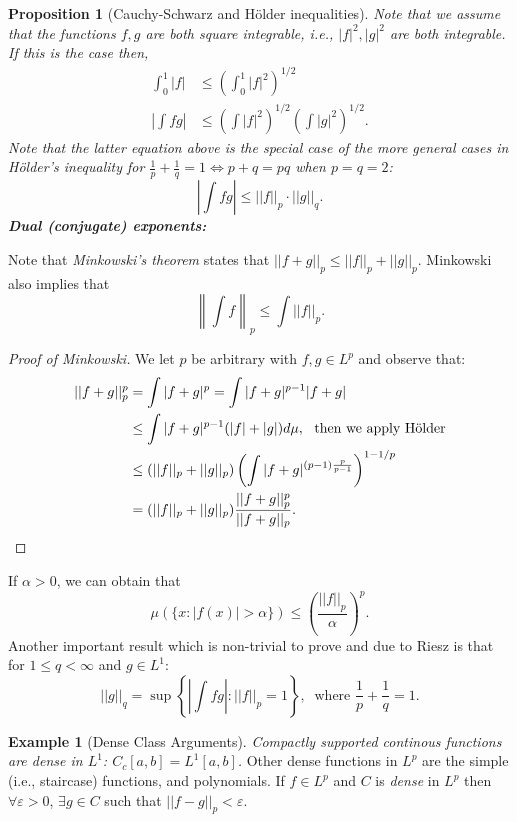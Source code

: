 \documentclass[12pt,reqno]{article}
\renewcommand{\emph}[1]{\textit{#1}}
\theoremstyle{plain}
\newtheorem{prop}[theorem]{Proposition}
\theoremstyle{definition}
\newtheorem{example}[theorem]{Example}
\begin{document}
\begin{prop}[Cauchy-Schwarz and H\"older inequalities] 
Note that we assume that the functions $f,g$ are both square integrable, i.e., 
$|f|^2,|g|^2$ are both integrable. If this is the case then, 
\begin{align*} 
\int_0^1 |f| & \leq \left(\int_0^1 |f|^2\right)^{1/2} \\ 
\left\lvert \int fg\right\rvert & \leq \left(\int |f|^2\right)^{1/2} \left(\int |g|^2\right)^{1/2}. 
\end{align*} 
Note that the latter equation above is the special case of the more general cases in 
\emph{H\"older's inequality} for $\frac{1}{p}+\frac{1}{q}=1 \iff p+q=pq$ when $p=q=2$: 
\[
\left\lvert \int fg \right\rvert \leq ||f||_p \cdot ||g||_q. 
\]
\textbf{Dual (conjugate) exponents:}  
\end{prop} 
\noindent 
Note that \emph{Minkowski's theorem} states that 
$||f+g||_p \leq ||f||_p + ||g||_p$. 
Minkowski also implies that 
\[
\left\lVert \int f \right\rVert_p \leq \int ||f||_p. 
\] 
\begin{proof}[Proof of Minkowski]
We let $p$ be arbitrary with $f,g \in L^p$ and observe that: 
\begin{align*} 
||f+g||_p^p & = \int |f+g|^p = \int |f+g|^{p-1} |f+g| \\ 
     & \leq \int |f+g|^{p-1}(|f|+|g|) d\mu,\ \text{ then we apply H\"older} \\ 
     & \leq (||f||_p+||g||_p) \left(\int |f+g|^{(p-1)\frac{p}{p-1}}\right)^{1-1/p} \\ 
     & = (||f||_p+||g||_p) \frac{||f+g||_p^p}{||f+g||_p}. 
     \qedhere
\end{align*} 
\end{proof} 
\noindent 
If $\alpha > 0$, we can obtain that 
\[
\mu\left(\{x : |f(x)| > \alpha\}\right) \leq \left(\frac{||f||_p}{\alpha}\right)^p. 
\]
Another important result which is non-trivial to prove and due to Riesz is that for 
$1 \leq q < \infty$ and $g \in L^1$:
\[
||g||_q = \sup \left\{\left\lvert\int fg \right\rvert : ||f||_p=1\right\},\ 
     \text{ where } \frac{1}{p}+\frac{1}{q} = 1. 
\]

\begin{example}[Dense Class Arguments]
\emph{Compactly supported continous functions are dense in $L^1$: 
$C_c[a,b] = L^1[a,b]$.} Other dense functions in $L^p$ are the simple (i.e., staircase) functions, 
and polynomials. If $f \in L^p$ and $C$ is \emph{dense} in $L^p$ then 
$\forall \varepsilon > 0$, $\exists g \in C$ such that $||f-g||_p < \varepsilon$. 
\end{example} 
\end{document}
